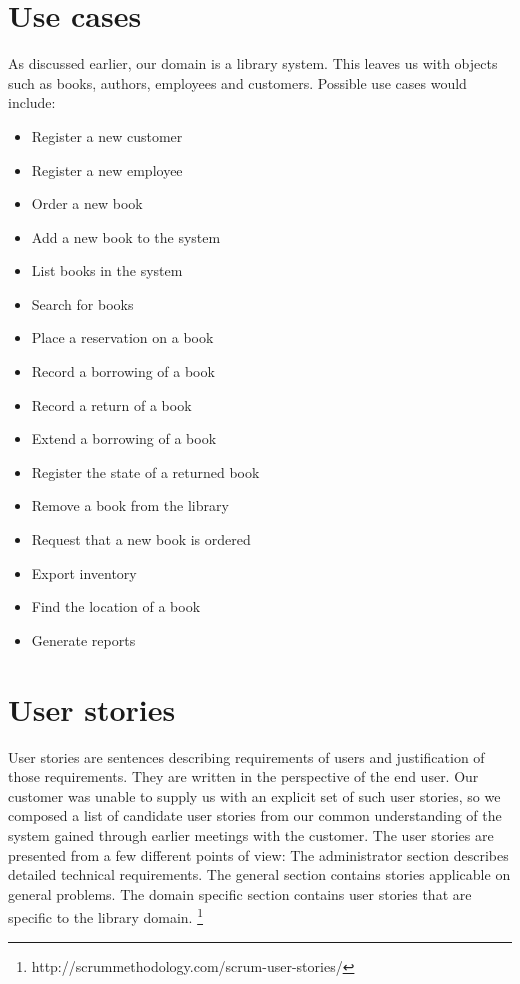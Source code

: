 \section{Use cases}
As discussed earlier, our domain is a library system. This leaves us with objects such as books, authors, employees and customers. Possible use cases would include:
\begin{itemize}
  \item Register a new customer
  \item Register a new employee
  \item Order a new book
  \item Add a new book to the system
  \item List books in the system
  \item Search for books
  \item Place a reservation on a book
  \item Record a borrowing of a book
  \item Record a return of a book
  \item Extend a borrowing of a book
  \item Register the state of a returned book
  \item Remove a book from the library
  \item Request that a new book is ordered
  \item Export inventory
  \item Find the location of a book
  \item Generate reports
\end{itemize}

\begin{center}
\label{usecase-customer}%
\end{center}

\begin{center}
\label{usecase-employee}%
\end{center}



\section{User stories}
User stories are sentences describing requirements of users and justification of those requirements. They are written in the perspective of the end user. Our customer was unable to supply us with an explicit set of such user stories, so we composed a list of candidate user stories from our common understanding of the system gained through earlier meetings with the customer. The user stories are presented from a few different points of view: The administrator section describes detailed technical requirements. The general section contains stories applicable on general problems. The domain specific section contains user stories that are specific to the library domain. \footnote{http://scrummethodology.com/scrum-user-stories/}

